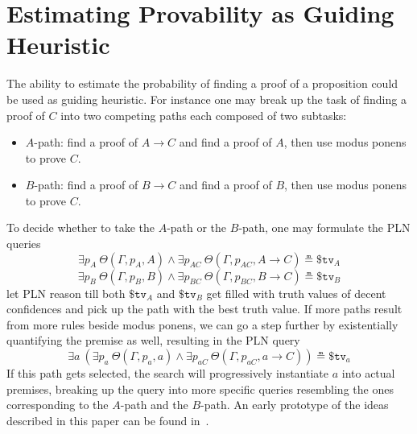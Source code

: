 \documentclass{easychair}
\begin{document}
\section{Estimating Provability as Guiding Heuristic}

The ability to estimate the probability of finding a proof of a
proposition could be used as guiding heuristic.  For instance one may
break up the task of finding a proof of $C$ into two competing paths
each composed of two subtasks:
\begin{itemize}
\item $A$-path: find a proof of $A \to C$ and find a proof of $A$,
  then use modus ponens to prove $C$.
\item $B$-path: find a proof of $B \to C$ and find a proof of $B$,
  then use modus ponens to prove $C$.
\end{itemize}
To decide whether to take the $A$-path or the $B$-path, one may
formulate the PLN queries
$$\exists p_A\ \Theta(\Gamma, p_A, A) \land \exists
p_{AC}\ \Theta(\Gamma, p_{AC}, A \to C) \measeq \$\texttt{tv}_A$$
$$\exists p_B\ \Theta(\Gamma, p_B, B) \land \exists
p_{BC}\ \Theta(\Gamma, p_{BC}, B \to C) \measeq \$\texttt{tv}_B$$ let
PLN reason till both $\$\texttt{tv}_A$ and $\$\texttt{tv}_B$ get
filled with truth values of decent confidences and pick up the path
with the best truth value.  If more paths result from more rules
beside modus ponens, we can go a step further by existentially
quantifying the premise as well, resulting in the PLN query
$$\exists a\ \left(\exists p_a\ \Theta(\Gamma, p_a, a) \land \exists
p_{aC}\ \Theta(\Gamma, p_{aC}, a \to C)\right) \measeq
\$\texttt{tv}_a$$ If this path gets selected, the search will
progressively instantiate $a$ into actual premises, breaking up the
query into more specific queries resembling the ones corresponding to
the $A$-path and the $B$-path.  An early prototype of the ideas
described in this paper can be found in~\cite{Geisweiller2025PICM}.

\newpage



\label{sect:bib}
%
%
%


\newpage


\appendix

\end{document}
